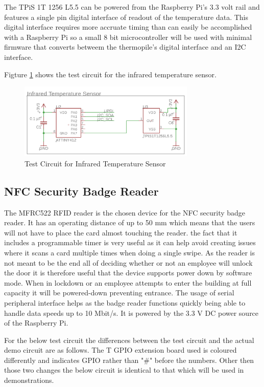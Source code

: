 The TPiS 1T 1256 L5.5 can be powered from the Raspberry Pi's 3.3 volt rail and
features a single pin digital interface of readout of the temperature data. This
digital interface requires more accruate timing than can easily be accomplished
with a Raspberry Pi so a small 8 bit microcontroller will be used with minimal
firmware that converts betweem the thermopile's digital interface and an I2C
interface.

Figture \ref{fig:ir-test-circuit} shows the test circuit for the infrared
temperature sensor.

\begin{figure}[!htb]
\centering
\includegraphics[width=0.75\textwidth]{images/ir-test-circuit.png}
\caption{Test Circuit for Infrared Temperature Sensor}
\label{fig:ir-test-circuit}
\end{figure}

\subsection{NFC Security Badge Reader}

The MFRC522 RFID reader is the chosen device for the NFC security badge reader. 
It has an operating distance of up to 50 mm which means that the users will not have to place
the card almost touching the reader. the fact that it includes a programmable timer
is very useful as it can help avoid creating issues where it scans a card multiple times 
when doing a single swipe. As the reader is not meant to be the end all of deciding 
whether or not an employee will unlock the door it is therefore useful that the device
supports power down by software mode. When in lockdown or an employee attempts
to enter the building at full capacity it will be powered-down preventing entrance.  
The usage of serial peripheral interface helps as the badge reader functions quickly 
being able to handle data speeds up to 10 Mbit/s. 
It is powered by the 3.3 V DC power source of the Raspberry Pi.


For the below test circuit the differences between the test circuit and the actual demo circuit
are as follows. The T GPIO extension board used is coloured differently
and indicates GPIO rather than "\#" before the numbers. 
Other then those two changes the below circuit is identical to that which will be used in demonstrations.

